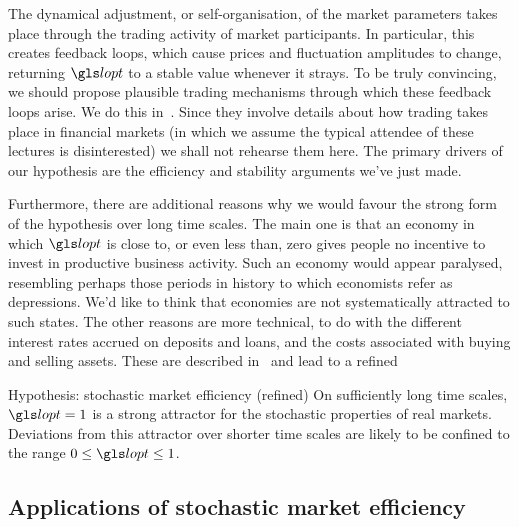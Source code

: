The dynamical adjustment, or self-organisation, of the market parameters takes place through the trading activity of market participants. In particular, this creates feedback loops, which cause prices and fluctuation amplitudes to change, returning $\lopt$ to a stable value whenever it strays. To be truly convincing, we should propose plausible trading mechanisms through which these feedback loops arise. We do this in~\cite{PetersAdamou2013}. Since they involve details about how trading takes place in financial markets (in which we assume the typical attendee of these lectures is disinterested) we shall not rehearse them here. The primary drivers of our hypothesis are the efficiency and stability arguments we've just made.

Furthermore, there are additional reasons why we would favour the strong form of the hypothesis over long time scales. The main one is that an economy in which $\lopt$ is close to, or even less than, zero gives people no incentive to invest in productive business activity. Such an economy would appear paralysed, resembling perhaps those periods in history to which economists refer as depressions. We'd like to think that economies are not systematically attracted to such states. The other reasons are more technical, to do with the different interest rates accrued on deposits and loans, and the costs associated with buying and selling assets. These are described in~\cite{PetersAdamou2013} and lead to a refined
\begin{keypts}{Hypothesis: stochastic market efficiency (refined)}
On sufficiently long time scales, $\lopt=1$ is a strong attractor for the stochastic properties of real markets. Deviations from this attractor over shorter time scales are likely to be confined to the range $0\leq\lopt\leq1$.
\end{keypts}

\subsection{Applications of stochastic market efficiency}
